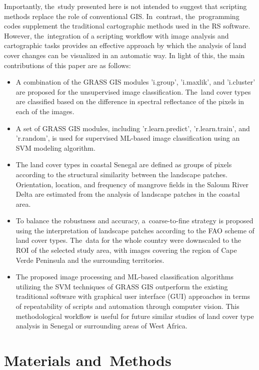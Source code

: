 \documentclass[earth,article,accept,pdftex,moreauthors]{Definitions/mdpi}
\begin{document}
Importantly, the~study presented here is not intended to suggest that scripting methods {replace }{the role of conventional GIS}. In~contrast, the~programming codes{ }supplement the traditional cartographic methods used in the {RS} software. However, the~integration of a scripting workflow with image analysis{ }and cartographic {tasks} provides an effective approach by which the analysis of land cover changes can be visualized in an automatic way. {In light of this, }the main contributions of this paper are as follows: 

\begin{itemize}
  \item A combination of the GRASS GIS modules 'i.group', 'i.maxlik', and 'i.cluster' are proposed for {the }{unsupervised }image classification. The~land cover types are classified based on the difference in spectral reflectance of the pixels in {each of }the images.
  \item {A set of  GRASS GIS modules, {including} 'r.learn.predict', 'r.learn.train', and 'r.random', is used for supervised ML-based image classification using an {SVM} modeling algorithm.}
  \item The land cover types in  coastal Senegal are defined as  groups of pixels according to the structural similarity between the landscape patches. Orientation, location, and frequency of mangrove fields in the Saloum River Delta are estimated from the analysis of landscape patches in the coastal area.
  \item To balance {the} robustness and accuracy, a~coarse-to-fine strategy is proposed {using} the interpretation of landscape patches {according to the} FAO scheme of land cover types{. The~data for the whole country were} downscaled to the ROI of the selected study area, with images covering the region of Cape Verde Peninsula and the surrounding territories.
  \item The proposed image processing and {ML-based }classification algorithms utilizing the {SVM techniques of }GRASS GIS outperform {the }existing traditional software with {graphical user interface (GUI)} approaches in terms of repeatability of scripts and automation {through computer vision. This methodological workflow }is useful for future similar studies {of} land cover type analysis in Senegal {or surrounding areas of West Africa}.
\end{itemize}

\section{Materials and~Methods}
\end{document}
